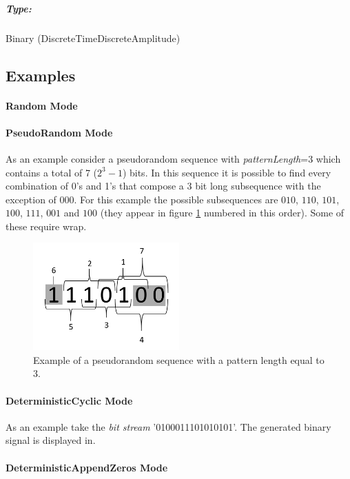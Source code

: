 \subparagraph*{Type:} Binary (DiscreteTimeDiscreteAmplitude)

\subsection*{Examples} 

\paragraph*{Random Mode}

\paragraph*{PseudoRandom Mode}
As an example consider a pseudorandom sequence with \textit{patternLength}=3 which contains a total of 7 ($2^3-1$) bits. In this sequence it is possible to find every combination of 0's and 1's that compose a 3 bit long subsequence with the exception of $000$. For this example the possible subsequences are $010$, $110$, $101$, $100$, $111$, $001$ and $100$ (they appear in figure \ref{BinarySequenceN3} numbered in this order). Some of these require wrap. 

\begin{figure}[h]
	\centering
\includegraphics[width=0.5\textwidth]{../m_qam_transmitter/figures/BinarySequenceN3}
\caption{Example of a pseudorandom sequence with a pattern length equal to 3.}\label{BinarySequenceN3}
\end{figure}

\paragraph*{DeterministicCyclic Mode}

As an example take the \textit{bit stream} '0100011101010101'. The generated binary signal is displayed in.

\paragraph*{DeterministicAppendZeros Mode}

